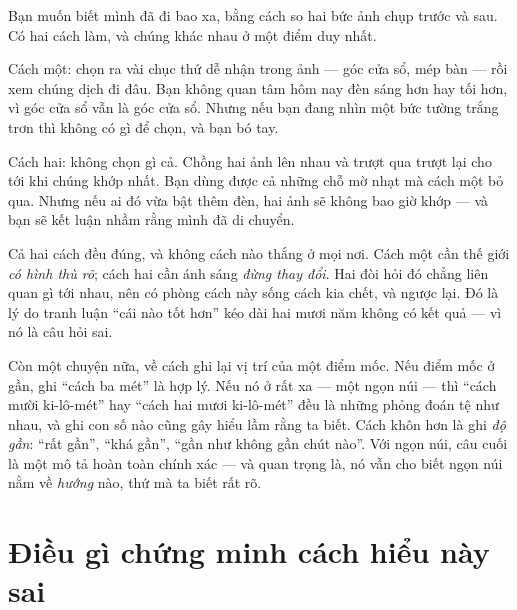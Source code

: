 \documentclass[../../vslam.tex]{subfiles}
\begin{document}
\begin{dongian}
Bạn muốn biết mình đã đi bao xa, bằng cách so hai bức ảnh chụp trước và sau. Có hai cách làm, và chúng khác nhau ở một điểm duy nhất.

Cách một: chọn ra vài chục thứ dễ nhận trong ảnh --- góc cửa sổ, mép bàn --- rồi xem chúng dịch đi đâu. Bạn không quan tâm hôm nay đèn sáng hơn hay tối hơn, vì góc cửa sổ vẫn là góc cửa sổ. Nhưng nếu bạn đang nhìn một bức tường trắng trơn thì không có gì để chọn, và bạn bó tay.

Cách hai: không chọn gì cả. Chồng hai ảnh lên nhau và trượt qua trượt lại cho tới khi chúng khớp nhất. Bạn dùng được cả những chỗ mờ nhạt mà cách một bỏ qua. Nhưng nếu ai đó vừa bật thêm đèn, hai ảnh sẽ không bao giờ khớp --- và bạn sẽ kết luận nhầm rằng mình đã di chuyển.

Cả hai cách đều đúng, và không cách nào thắng ở mọi nơi. Cách một cần thế giới \emph{có hình thù rõ}; cách hai cần ánh sáng \emph{đừng thay đổi}. Hai đòi hỏi đó chẳng liên quan gì tới nhau, nên có phòng cách này sống cách kia chết, và ngược lại. Đó là lý do tranh luận ``cái nào tốt hơn'' kéo dài hai mươi năm không có kết quả --- vì nó là câu hỏi sai.

Còn một chuyện nữa, về cách ghi lại vị trí của một điểm mốc. Nếu điểm mốc ở gần, ghi ``cách ba mét'' là hợp lý. Nếu nó ở rất xa --- một ngọn núi --- thì ``cách mười ki-lô-mét'' hay ``cách hai mươi ki-lô-mét'' đều là những phỏng đoán tệ như nhau, và ghi con số nào cũng gây hiểu lầm rằng ta biết. Cách khôn hơn là ghi \emph{độ gần}: ``rất gần'', ``khá gần'', ``gần như không gần chút nào''. Với ngọn núi, câu cuối là một mô tả hoàn toàn chính xác --- và quan trọng là, nó vẫn cho biết ngọn núi nằm về \emph{hướng} nào, thứ mà ta biết rất rõ.

\end{dongian}

\section{Điều gì chứng minh cách hiểu này sai}
\end{document}
